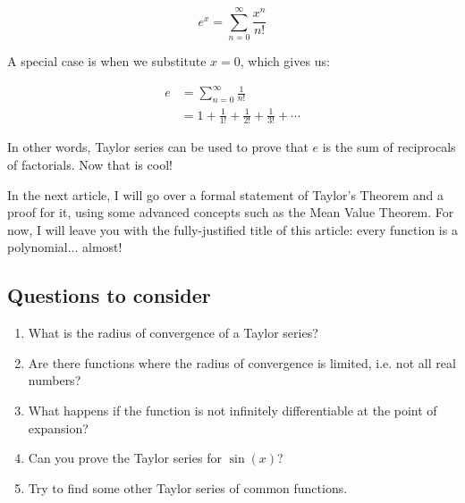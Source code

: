 \documentclass{article}
\begin{document}
$$
e^x = \sum_{n=0}^{\infty} \frac{x^n}{n!}
$$

A special case is when we substitute $x=0$, which gives us:

\begin{align*}
e &= \sum_{n=0}^{\infty} \frac{1}{n!} \\
    &= 1 + \frac{1}{1!} + \frac{1}{2!} + \frac{1}{3!} + \cdots
\end{align*}

In other words, Taylor series can be used to prove that $e$ is the sum of reciprocals of factorials. Now that is cool!

In the next article, I will go over a formal statement of Taylor's Theorem and a proof for it, using some advanced concepts such as the Mean Value Theorem. For now, I will leave you with the fully-justified title of this article: every function is a polynomial... almost!

\subsection*{Questions to consider}

\begin{enumerate}
    \item What is the radius of convergence of a Taylor series?
    \item Are there functions where the radius of convergence is limited, i.e. not all real numbers?
    \item What happens if the function is not infinitely differentiable at the point of expansion?
    \item Can you prove the Taylor series for $\sin(x)$?
    \item Try to find some other Taylor series of common functions.
\end{enumerate}
\end{document}
